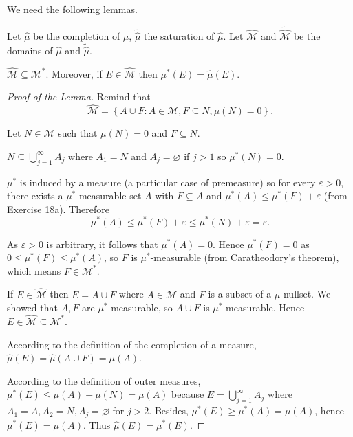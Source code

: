 We need the following lemmas.

Let \( \widehat{\mu} \) be the completion of \( \mu \), \( \widetilde{\widehat{\mu}} \) the saturation of \( \widehat{\mu} \). Let \( \widehat{\mathcal{M}} \) and \( \widetilde{\widehat{\mathcal{M}}} \) be the domains of \( \widehat{\mu} \) and \( \widetilde{\widehat{\mu}} \).

\begin{lemma}\label{lemma:completion-is-included-in-saturation}
    \( \widehat{\mathcal{M}} \subseteq \mathcal{M}^{\ast} \). Moreover, if \( E \in \widehat{\mathcal{M}} \) then \( \mu^{\ast}(E) = \widehat{\mu}(E) \).
\end{lemma}

\begin{proof}[Proof of the Lemma]
    Remind that
    \[
        \widehat{\mathcal{M}} = \left\{ A \cup F : A \in \mathcal{M}, F \subseteq N, \mu(N) = 0 \right\}.
    \]

    Let \( N \in \mathcal{M} \) such that \( \mu(N) = 0 \) and \( F \subseteq N \).

    \( N \subseteq \bigcup_{j=1}^{\infty} A_{j} \) where \( A_{1} = N \) and \( A_{j} = \varnothing \) if \( j > 1 \) so \( \mu^{\ast}(N) = 0 \).

    \( \mu^{\ast} \) is induced by a measure (a particular case of premeasure) so for every \( \varepsilon > 0 \), there exists a \( \mu^{\ast} \)-measurable set \( A \) with \( F \subseteq A \) and \( \mu^{\ast}(A) \le \mu^{\ast}(F) + \varepsilon \) (from Exercise 18a). Therefore
    \[
        \mu^{\ast}(A) \le \mu^{\ast}(F) + \varepsilon \le \mu^{\ast}(N) + \varepsilon = \varepsilon.
    \]

    As \( \varepsilon > 0 \) is arbitrary, it follows that \( \mu^{\ast}(A) = 0 \). Hence \( \mu^{\ast}(F) = 0 \) as \( 0 \le \mu^{\ast}(F) \le \mu^{\ast}(A) \), so \( F \) is \( \mu^{\ast} \)-measurable (from Caratheodory's theorem), which means \( F \in \mathcal{M}^{\ast} \).

    If \( E \in \widehat{\mathcal{M}} \) then \( E = A \cup F \) where \( A \in \mathcal{M} \) and \( F \) is a subset of a \( \mu \)-nullset. We showed that \( A, F \) are \( \mu^{\ast} \)-measurable, so \( A \cup F \) is \( \mu^{\ast} \)-measurable. Hence \( E \in \widehat{\mathcal{M}} \subseteq \mathcal{M}^{\ast} \).

    According to the definition of the completion of a measure, \( \widehat{\mu}(E) = \widehat{\mu}(A \cup F) = \mu(A) \).

    According to the definition of outer measures, \( \mu^{\ast}(E) \le \mu(A) + \mu(N) = \mu(A) \) because \( E = \bigcup_{j=1}^{\infty} A_{j} \) where \( A_{1} = A, A_{2} = N, A_{j} = \varnothing \) for \( j > 2 \). Besides, \( \mu^{\ast}(E) \ge \mu^{\ast}(A) = \mu(A) \), hence \( \mu^{\ast}(E) = \mu(A) \). Thus \( \widehat{\mu}(E) = \mu^{\ast}(E) \).
\end{proof}

